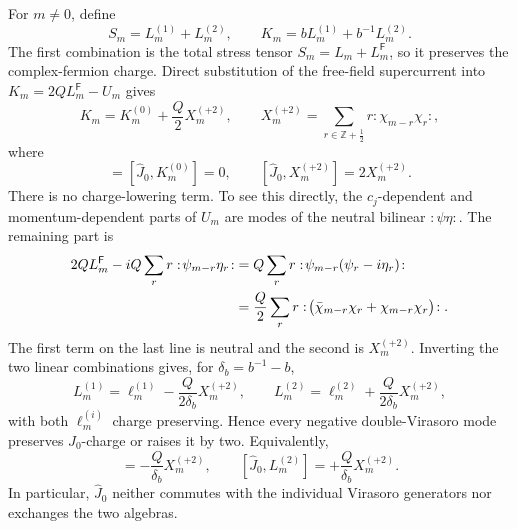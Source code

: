 \documentclass[11pt]{article}
\newcommand{\Ff}{\mathsf F}
\begin{document}
For \(m\ne0\), define
\begin{equation}
 S_m=L_m^{(1)}+L_m^{(2)},
 \qquad
 K_m=bL_m^{(1)}+b^{-1}L_m^{(2)}.
\end{equation}
The first combination is the total stress tensor
\(S_m=L_m+L_m^{\Ff}\), so it preserves the complex-fermion charge.  Direct
substitution of the free-field supercurrent into
\(K_m=2QL_m^{\Ff}-U_m\) gives
\begin{equation}
 K_m=K_m^{(0)}+\frac Q2X_m^{(+2)},
 \qquad
 X_m^{(+2)}=\sum_{r\in\mathbb Z+\frac12}
 r:\!\chi_{m-r}\chi_r\!:,
 \label{eq:NS-triangular-K}
\end{equation}
where
\begin{equation}
 [\widehat J_0,S_m]=[\widehat J_0,K_m^{(0)}]=0,
 \qquad
 [\widehat J_0,X_m^{(+2)}]=2X_m^{(+2)}.
 \label{eq:NS-triangular-charges}
\end{equation}
There is no charge-lowering term.  To see this directly, the
\(c_j\)-dependent and momentum-dependent parts of \(U_m\) are modes of
the neutral bilinear \(:\!\psi\eta\!:\).  The remaining part is
\begin{align}
 2QL_m^{\Ff}-iQ\sum_r r:\!\psi_{m-r}\eta_r\!:
 & =Q\sum_r r:\!\psi_{m-r}(\psi_r-i\eta_r)\!:
 \notag\\
 & =\frac Q2\sum_r r:\!
 \bigl(\bar\chi_{m-r}\chi_r+\chi_{m-r}\chi_r\bigr)\!:.
 \label{eq:NS-one-sided-charge-derivation}
\end{align}
The first term on the last line is neutral and the second is
\(X_m^{(+2)}\).  Inverting the two linear combinations gives, for
\(\delta_b=b^{-1}-b\),
\begin{equation}
 L_m^{(1)}=\ell_m^{(1)}-\frac{Q}{2\delta_b}X_m^{(+2)},
 \qquad
 L_m^{(2)}=\ell_m^{(2)}+\frac{Q}{2\delta_b}X_m^{(+2)},
 \label{eq:NS-triangular-L12}
\end{equation}
with both \(\ell_m^{(i)}\) charge preserving.  Hence every negative
double-Virasoro mode preserves \(\widehat J_0\)-charge or raises it by two.
Equivalently,
\begin{equation}
 [\widehat J_0,L_m^{(1)}]
 =-\frac{Q}{\delta_b}X_m^{(+2)},
 \qquad
 [\widehat J_0,L_m^{(2)}]
 =+\frac{Q}{\delta_b}X_m^{(+2)}.
 \label{eq:NS-actual-J0-commutators}
\end{equation}
In particular, \(\widehat J_0\) neither commutes with the individual
Virasoro generators nor exchanges the two algebras.
\end{document}

